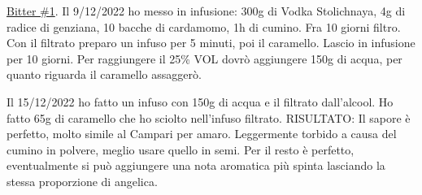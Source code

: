 \serves{-}%
\begin{ingreds}




\end{ingreds}

\begin{method}
\underline{Bitter \#1}. Il 9/12/2022 ho messo in infusione: 300g di Vodka Stolichnaya, 4g di radice di genziana, 10 bacche di cardamomo, 1h di cumino. Fra 10 giorni filtro. Con il filtrato preparo un infuso per 5 minuti, poi il caramello. Lascio in infusione per 10 giorni. Per raggiungere il 25\% VOL dovrò aggiungere 150g di acqua, per quanto riguarda il caramello assaggerò.

Il 15/12/2022 ho fatto un infuso con 150g di acqua e il filtrato dall'alcool. Ho fatto 65g di caramello che ho sciolto nell'infuso filtrato. RISULTATO: Il sapore è perfetto, molto simile al Campari per amaro. Leggermente torbido a causa del cumino in polvere, meglio usare quello in semi. Per il resto è perfetto, eventualmente si può aggiungere una nota aromatica più spinta lasciando la stessa proporzione di angelica.

\end{method}




